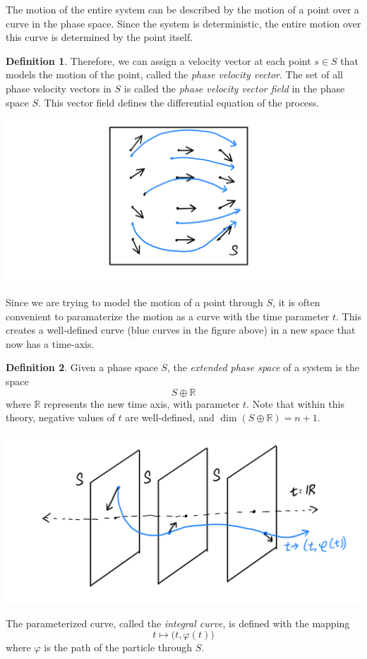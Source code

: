 \documentclass{article}
\theoremstyle{remark}
\theoremstyle{definition}
\newtheorem{definition}{Definition}[section]
\begin{document}
The motion of the entire system can be described by the motion of a point over a curve in the phase space. Since the system is deterministic, the entire motion over this curve is determined by the point itself. 
\begin{definition}
Therefore, we can assign a velocity vector at each point $s \in S$ that models the motion of the point, called the \textit{phase velocity vector}. The set of all phase velocity vectors in $S$ is called the \textit{phase velocity vector field} in the phase space $S$. This vector field defines the differential equation of the process. 
\begin{center}
  \includegraphics[scale=0.25]{img/Phase_Velocity_Vector_Field.PNG}
\end{center}
Since we are trying to model the motion of a point through $S$, it is often convenient to paramaterize the motion as a curve with the time parameter $t$. This creates a well-defined curve (blue curves in the figure above) in a new space that now has a time-axis. 
\end{definition}


\begin{definition}
Given a phase space $S$, the \textit{extended phase space} of a system is the space 
\[S \oplus \mathbb{R}\]
where $\mathbb{R}$ represents the new time axis, with parameter $t$. Note that within this theory, negative values of $t$ are well-defined, and $\dim{(S \oplus \mathbb{R})} = n+1$. 
\begin{center}
\includegraphics[scale=0.25]{img/Extended_Phase_Space.PNG}
\end{center}
The parameterized curve, called the \textit{integral curve}, is defined with the mapping
\[t \mapsto \big( t, \varphi(t) \big)\]
where $\varphi$ is the path of the particle through $S$. 
\end{definition}
\end{document}
